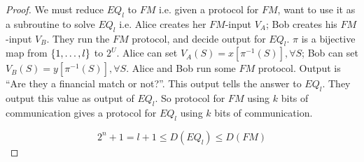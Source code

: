\begin{proof}
    We must reduce $EQ_l$ to $FM$ i.e. given a protocol for $FM$, want to use it as a subroutine to solve $EQ_l$ i.e. Alice creates her $FM$-input $V_A$; Bob creates his $FM$-input $V_B$. They run the $FM$ protocol, and decide output for $EQ_l$. $\pi$ is a bijective map from $\left \{ 1, \ldots, l \right \}$ to $2^U$. Alice can set $V_A(S) = x[\pi^{-1}(S)], \forall S$; Bob can set $V_B(S) = y[\pi^{-1}(S)], \forall S$. Alice and Bob run some $FM$ protocol. Output is ``Are they a financial match or not?''. This output tells the answer to $EQ_l$. They output this value as output of $EQ_l$. So protocol for $FM$ using $k$ bits of communication gives a protocol for $EQ_l$ using $k$ bits of communication.

    \begin{equation*}
        2^n + 1 = l + 1 \leq D(EQ_l) \leq D(FM)
    \end{equation*}
\end{proof}
